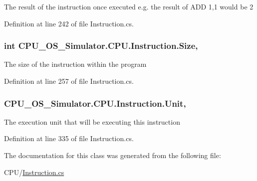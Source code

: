 The result of the instruction once executed e.\+g. the result of A\+D\+D 1,1 would be 2 



Definition at line 242 of file Instruction.\+cs.

\hypertarget{class_c_p_u___o_s___simulator_1_1_c_p_u_1_1_instruction_a7c60418808e7bd6cb1964a227dcd9dac}{}
\subsubsection[{Size}]{\setlength{\rightskip}{0pt plus 5cm}int C\+P\+U\+\_\+\+O\+S\+\_\+\+Simulator.\+C\+P\+U.\+Instruction.\+Size\hspace{0.3cm}{\ttfamily [get]}, {\ttfamily [set]}}\label{class_c_p_u___o_s___simulator_1_1_c_p_u_1_1_instruction_a7c60418808e7bd6cb1964a227dcd9dac}


The size of the instruction within the program 



Definition at line 257 of file Instruction.\+cs.

\hypertarget{class_c_p_u___o_s___simulator_1_1_c_p_u_1_1_instruction_a75e93b5a62558ece7da698068625bd8f}{}
\subsubsection[{Unit}]{ C\+P\+U\+\_\+\+O\+S\+\_\+\+Simulator.\+C\+P\+U.\+Instruction.\+Unit\hspace{0.3cm}{\ttfamily [get]}, {\ttfamily [set]}}\label{class_c_p_u___o_s___simulator_1_1_c_p_u_1_1_instruction_a75e93b5a62558ece7da698068625bd8f}


The execution unit that will be executing this instruction 



Definition at line 335 of file Instruction.\+cs.



The documentation for this class was generated from the following file\+:\begin{DoxyCompactItemize}
\item 
C\+P\+U/\hyperlink{_instruction_8cs}{Instruction.\+cs}\end{DoxyCompactItemize}
